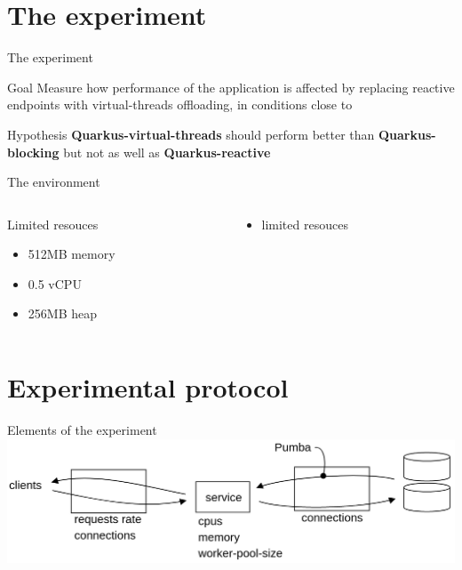 \documentclass{beamer}
\begin{document}
\section{The experiment}
\begin{frame}{The experiment}
    \begin{block}{Goal}
        Measure how performance of the application is affected by replacing reactive endpoints with virtual-threads offloading, in conditions close to
    \end{block}
    \begin{block}{Hypothesis}
        \textbf{Quarkus-virtual-threads} should perform better than \textbf{Quarkus-blocking} but not as well as \textbf{Quarkus-reactive}
    \end{block}
\end{frame}
\begin{frame}{The environment}
    \begin{columns}
        \begin{column}{0.5\textwidth}
            Limited resouces
            \begin{itemize}    
                \item 512MB memory
                \item 0.5 vCPU
                \item 256MB heap
            \end{itemize}
        \end{column}
        \begin{column}{0.5\textwidth}
            
            \begin{itemize}    
                \item limited resouces
            \end{itemize}
        \end{column}
    \end{columns}
\end{frame}

\section{Experimental protocol}
\begin{frame}{Elements of the experiment}
    \includegraphics[width=\textwidth]{assets/exp.png}
\end{frame}
\end{document}
